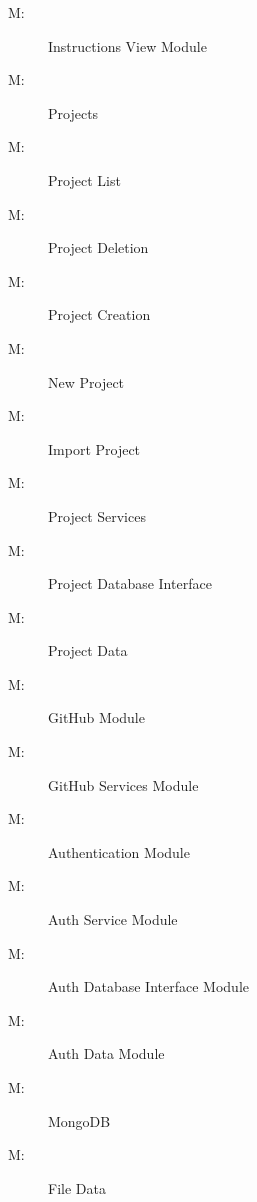 \documentclass[12pt, titlepage]{article}
\newcounter{mnum}
\newcommand{\mthemnum}{M\themnum}
\begin{document}
\begin{description}
		\item [ \mthemnum: \label{m23}] Instructions View Module
		\item [ \mthemnum: \label{m24}] Projects
		\item [ \mthemnum: \label{m25}] Project List
		\item [ \mthemnum: \label{m26}] Project Deletion
		\item [ \mthemnum: \label{m27}] Project Creation
		\item [ \mthemnum: \label{m28}] New Project
		\item [ \mthemnum: \label{m29}] Import Project
		\item [ \mthemnum: \label{m30}] Project Services
		\item [ \mthemnum: \label{m31}] Project Database Interface
		\item [ \mthemnum: \label{m32}] Project Data
		\item [ \mthemnum: \label{m33}] GitHub Module
		\item [ \mthemnum: \label{m34}] GitHub Services Module
		\item [ \mthemnum: \label{m35}] Authentication Module
		\item [ \mthemnum: \label{m36}] Auth Service Module
		\item [ \mthemnum: \label{m37}] Auth Database Interface Module
		\item [ \mthemnum: \label{m38}] Auth Data Module
		\item [ \mthemnum: \label{m39}] MongoDB
		\item [ \mthemnum: \label{m40}] File Data
	\end{description}
	
\end{document}
